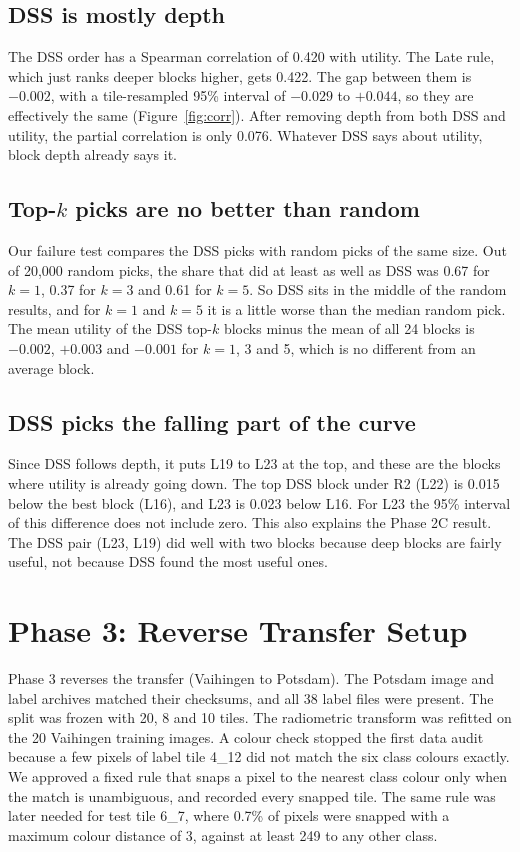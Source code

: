 \documentclass[11pt,a4paper]{report}
\begin{document}
\subsection{DSS is mostly depth}

The DSS order has a Spearman correlation of 0.420 with utility. The Late rule, which just ranks deeper blocks higher, gets 0.422. The gap between them is $-0.002$, with a tile-resampled 95\% interval of $-0.029$ to $+0.044$, so they are effectively the same (Figure~\ref{fig:corr}). After removing depth from both DSS and utility, the partial correlation is only 0.076. Whatever DSS says about utility, block depth already says it.

\subsection{Top-$k$ picks are no better than random}

Our failure test compares the DSS picks with random picks of the same size. Out of 20,000 random picks, the share that did at least as well as DSS was 0.67 for $k = 1$, 0.37 for $k = 3$ and 0.61 for $k = 5$. So DSS sits in the middle of the random results, and for $k = 1$ and $k = 5$ it is a little worse than the median random pick. The mean utility of the DSS top-$k$ blocks minus the mean of all 24 blocks is $-0.002$, $+0.003$ and $-0.001$ for $k = 1$, 3 and 5, which is no different from an average block.

\subsection{DSS picks the falling part of the curve}

Since DSS follows depth, it puts L19 to L23 at the top, and these are the blocks where utility is already going down. The top DSS block under R2 (L22) is 0.015 below the best block (L16), and L23 is 0.023 below L16. For L23 the 95\% interval of this difference does not include zero. This also explains the Phase 2C result. The DSS pair (L23, L19) did well with two blocks because deep blocks are fairly useful, not because DSS found the most useful ones.

\section{Phase 3: Reverse Transfer Setup}

Phase 3 reverses the transfer (Vaihingen to Potsdam). The Potsdam image and label archives matched their checksums, and all 38 label files were present. The split was frozen with 20, 8 and 10 tiles. The radiometric transform was refitted on the 20 Vaihingen training images. A colour check stopped the first data audit because a few pixels of label tile 4\_12 did not match the six class colours exactly. We approved a fixed rule that snaps a pixel to the nearest class colour only when the match is unambiguous, and recorded every snapped tile. The same rule was later needed for test tile 6\_7, where 0.7\% of pixels were snapped with a maximum colour distance of 3, against at least 249 to any other class.
\end{document}
